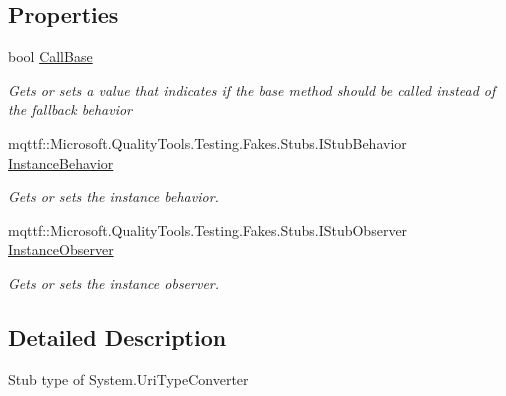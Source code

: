 \subsection*{Properties}
\begin{DoxyCompactItemize}
\item 
bool \hyperlink{class_system_1_1_fakes_1_1_stub_uri_type_converter_a4157a26fd166f310a50135b696679d5a}{Call\-Base}
\begin{DoxyCompactList}\small\item\em Gets or sets a value that indicates if the base method should be called instead of the fallback behavior\end{DoxyCompactList}\item 
mqttf\-::\-Microsoft.\-Quality\-Tools.\-Testing.\-Fakes.\-Stubs.\-I\-Stub\-Behavior \hyperlink{class_system_1_1_fakes_1_1_stub_uri_type_converter_a9c8bbd0a939ab70c798c225a958c80c4}{Instance\-Behavior}
\begin{DoxyCompactList}\small\item\em Gets or sets the instance behavior.\end{DoxyCompactList}\item 
mqttf\-::\-Microsoft.\-Quality\-Tools.\-Testing.\-Fakes.\-Stubs.\-I\-Stub\-Observer \hyperlink{class_system_1_1_fakes_1_1_stub_uri_type_converter_a138c6fc5d99a2a9e39991f44e6e76f92}{Instance\-Observer}
\begin{DoxyCompactList}\small\item\em Gets or sets the instance observer.\end{DoxyCompactList}\end{DoxyCompactItemize}


\subsection{Detailed Description}
Stub type of System.\-Uri\-Type\-Converter



